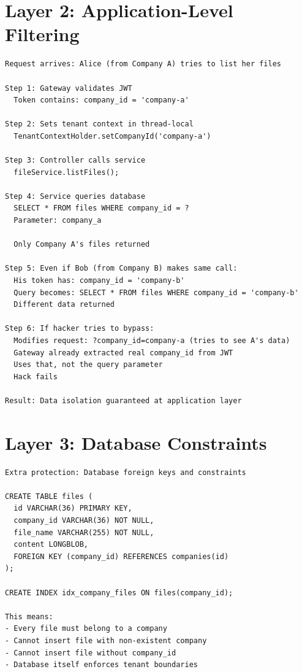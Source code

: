 \documentclass[11pt,a4paper]{report}
\begin{document}
\section{Layer 2: Application-Level Filtering}


\begin{lstlisting}[language=text]
Request arrives: Alice (from Company A) tries to list her files

Step 1: Gateway validates JWT
  Token contains: company_id = 'company-a'

Step 2: Sets tenant context in thread-local
  TenantContextHolder.setCompanyId('company-a')

Step 3: Controller calls service
  fileService.listFiles();

Step 4: Service queries database
  SELECT * FROM files WHERE company_id = ?
  Parameter: company_a
  
  Only Company A's files returned

Step 5: Even if Bob (from Company B) makes same call:
  His token has: company_id = 'company-b'
  Query becomes: SELECT * FROM files WHERE company_id = 'company-b'
  Different data returned

Step 6: If hacker tries to bypass:
  Modifies request: ?company_id=company-a (tries to see A's data)
  Gateway already extracted real company_id from JWT
  Uses that, not the query parameter
  Hack fails

Result: Data isolation guaranteed at application layer
\end{lstlisting}


\section{Layer 3: Database Constraints}


\begin{lstlisting}[language=text]
Extra protection: Database foreign keys and constraints

CREATE TABLE files (
  id VARCHAR(36) PRIMARY KEY,
  company_id VARCHAR(36) NOT NULL,
  file_name VARCHAR(255) NOT NULL,
  content LONGBLOB,
  FOREIGN KEY (company_id) REFERENCES companies(id)
);

CREATE INDEX idx_company_files ON files(company_id);

This means:
- Every file must belong to a company
- Cannot insert file with non-existent company
- Cannot insert file without company_id
- Database itself enforces tenant boundaries
\end{lstlisting}
\end{document}
